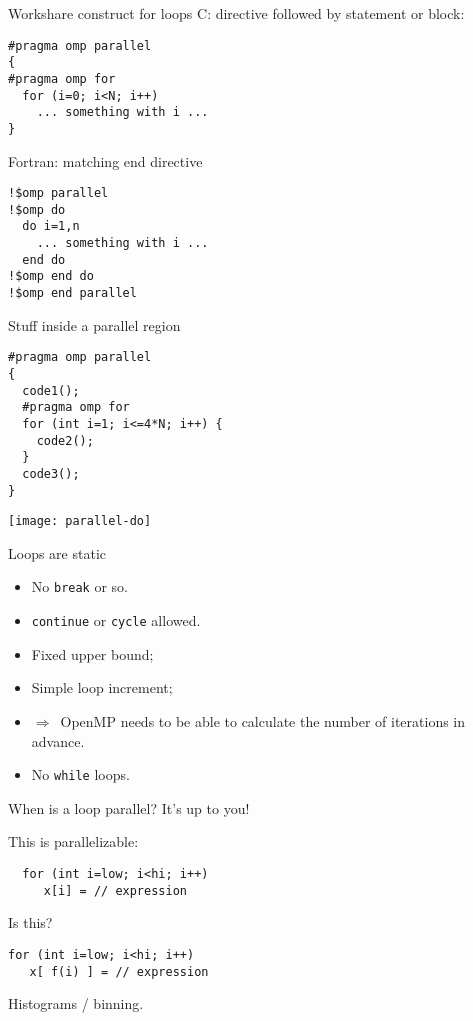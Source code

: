 \begin{numberedframe}{Workshare construct for loops}
C: directive followed by statement or block:
\begin{verbatim}
#pragma omp parallel
{
#pragma omp for
  for (i=0; i<N; i++)
    ... something with i ...
}
\end{verbatim}
Fortran: matching end directive
\begin{verbatim}
!$omp parallel
!$omp do
  do i=1,n
    ... something with i ...
  end do
!$omp end do
!$omp end parallel
\end{verbatim}
\end{numberedframe}

\begin{numberedframe}{Stuff inside a parallel region}
\begin{multicols}{2}  
\begin{verbatim}
#pragma omp parallel
{
  code1();
  #pragma omp for
  for (int i=1; i<=4*N; i++) {
    code2();
  }
  code3();
}
\end{verbatim}
\columnbreak
\texttt{[image: parallel-do]}
\end{multicols}
\end{numberedframe}

\begin{numberedframe}{Loops are static}
  \begin{itemize}
  \item No \lstinline{break} or so.
  \item \lstinline{continue} or \lstinline{cycle} allowed.
  \item Fixed upper bound;
  \item Simple loop increment;
  \item $\Rightarrow$~OpenMP needs to be able to calculate
    the number of iterations in advance.
  \item No \lstinline{while} loops.
  \end{itemize}
\end{numberedframe}

\begin{numberedframe}{When is a loop parallel?}
  It's up to you!

  This is parallelizable:
\begin{lstlisting}
  for (int i=low; i<hi; i++)
     x[i] = // expression
\end{lstlisting}
Is this?
\begin{lstlisting}
for (int i=low; i<hi; i++)
   x[ f(i) ] = // expression
\end{lstlisting}
Histograms / binning.
\end{numberedframe}

